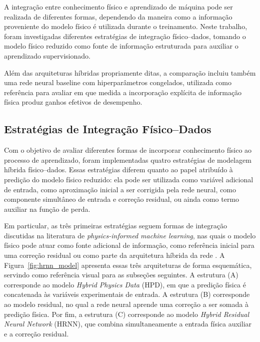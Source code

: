 A integração entre conhecimento físico e aprendizado de máquina pode ser realizada de diferentes formas, dependendo da maneira como a informação proveniente do modelo físico é utilizada durante o treinamento. Neste trabalho, foram investigadas diferentes estratégias de integração físico--dados, tomando o modelo físico reduzido como fonte de informação estruturada para auxiliar o aprendizado supervisionado.

Além das arquiteturas híbridas propriamente ditas, a comparação incluiu também uma rede neural baseline com hiperparâmetros congelados, utilizada como referência para avaliar em que medida a incorporação explícita de informação física produz ganhos efetivos de desempenho.

\subsection{Estratégias de Integração Físico--Dados}

Com o objetivo de avaliar diferentes formas de incorporar conhecimento físico ao processo de aprendizado, foram implementadas quatro estratégias de modelagem híbrida físico--dados. Essas estratégias diferem quanto ao papel atribuído à predição do modelo físico reduzido: ela pode ser utilizada como variável adicional de entrada, como aproximação inicial a ser corrigida pela rede neural, como componente simultâneo de entrada e correção residual, ou ainda como termo auxiliar na função de perda.

Em particular, as três primeiras estratégias seguem formas de integração discutidas na literatura de \textit{physics-informed machine learning}, nas quais o modelo físico pode atuar como fonte adicional de informação, como referência inicial para uma correção residual ou como parte da arquitetura híbrida da rede \cite{zhou2025physics}. A Figura~\ref{fig:hrnn_model} apresenta essas três arquiteturas de forma esquemática, servindo como referência visual para as subseções seguintes. A estrutura (A) corresponde ao modelo \textit{Hybrid Physics Data} (HPD), em que a predição física é concatenada às variáveis experimentais de entrada. A estrutura (B) corresponde ao modelo residual, no qual a rede neural aprende uma correção a ser somada à predição física. Por fim, a estrutura (C) corresponde ao modelo \textit{Hybrid Residual Neural Network} (HRNN), que combina simultaneamente a entrada física auxiliar e a correção residual.

